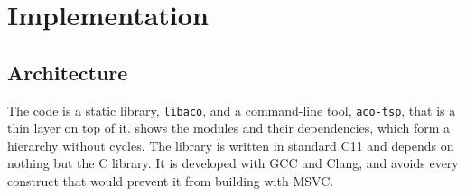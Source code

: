 \documentclass[11pt,a4paper]{article}
\newcommand{\tool}{\texttt{aco-tsp}}
\newcommand{\code}[1]{\texttt{#1}}
\begin{document}
\section{Implementation}
\label{sec:implementation}

\subsection{Architecture}

The code is a static library, \code{libaco}, and a command-line tool, \tool, that is a
thin layer on top of it.  shows the modules and their
dependencies, which form a hierarchy without cycles. The library is written in standard
C11 and depends on nothing but the C library. It is developed with GCC and Clang, and
avoids every construct that would prevent it from building with MSVC.
\end{document}
